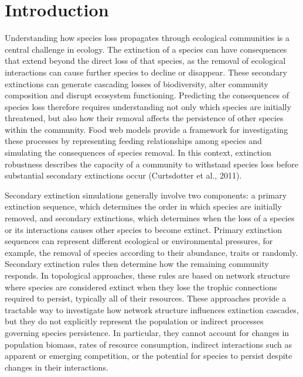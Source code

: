 \documentclass[
]{article}
\begin{document}
\newpage


\linenumbers
\doublespacing %

\makeatletter
{}%
\makeatother

\section{Introduction}\label{introduction}

Understanding how species loss propagates through ecological communities
is a central challenge in ecology. The extinction of a species can have
consequences that extend beyond the direct loss of that species, as the
removal of ecological interactions can cause further species to decline
or disappear. These secondary extinctions can generate cascading losses
of biodiversity, alter community composition and disrupt ecosystem
functioning. Predicting the consequences of species loss therefore
requires understanding not only which species are initially threatened,
but also how their removal affects the persistence of other species
within the community. Food web models provide a framework for
investigating these processes by representing feeding relationships
among species and simulating the consequences of species removal. In
this context, extinction robustness describes the capacity of a
community to withstand species loss before substantial secondary
extinctions occur (Curtsdotter et al., 2011).

Secondary extinction simulations generally involve two components: a
primary extinction sequence, which determines the order in which species
are initially removed, and secondary extinctions, which determines when
the loss of a species or its interactions causes other species to become
extinct. Primary extinction sequences can represent different ecological
or environmental pressures, for example, the removal of species
according to their abundance, traits or randomly. Secondary extinction
rules then determine how the remaining community responds. In
topological approaches, these rules are based on network structure where
species are considered extinct when they lose the trophic connections
required to persist, typically all of their resources. These approaches
provide a tractable way to investigate how network structure influences
extinction cascades, but they do not explicitly represent the population
or indirect processes governing species persistence. In particular, they
cannot account for changes in population biomass, rates of resource
consumption, indirect interactions such as apparent or emerging
competition, or the potential for species to persist despite changes in
their interactions.
\end{document}

